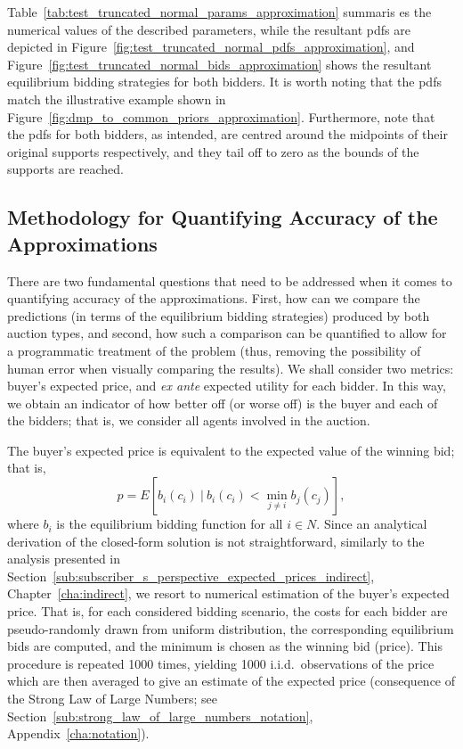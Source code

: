 Table~\ref{tab:test_truncated_normal_params_approximation} summaris es the numerical values of the described parameters, while the resultant pdfs are depicted in Figure~\ref{fig:test_truncated_normal_pdfs_approximation}, and Figure~\ref{fig:test_truncated_normal_bids_approximation} shows the resultant equilibrium bidding strategies for both bidders. It is worth noting that the pdfs match the illustrative example shown in Figure~\ref{fig:dmp_to_common_priors_approximation}. Furthermore, note that the pdfs for both bidders, as intended, are centred around the midpoints of their original supports respectively, and they tail off to zero as the bounds of the supports are reached.

\subsection{Methodology for Quantifying Accuracy of the Approximations} %
\label{sub:methodology_for_quantifying_accuracy_of_the_approximations_approximation}
There are two fundamental questions that need to be addressed when it comes to quantifying accuracy of the approximations. First, how can we compare the predictions (in terms of the equilibrium bidding strategies) produced by both auction types, and second, how such a comparison can be quantified to allow for a programmatic treatment of the problem (thus, removing the possibility of human error when visually comparing the results). We shall consider two metrics: buyer's expected price, and \emph{ex ante} expected utility for each bidder. In this way, we obtain an indicator of how better off (or worse off) is the buyer and each of the bidders; that is, we consider all agents involved in the auction.

The buyer's expected price is equivalent to the expected value of the winning bid; that is,
\begin{equation}
  \label{eq:expected_price_approximation}
  p = E[b_i(c_i) \:\vert\: b_i(c_i) < \min_{j\neq i} b_j(c_j)],
\end{equation}
where $b_i$ is the equilibrium bidding function for all $i\in N$. Since an analytical derivation of the closed-form solution is not straightforward, similarly to the analysis presented in Section~\ref{sub:subscriber_s_perspective_expected_prices_indirect}, Chapter~\ref{cha:indirect}, we resort to numerical estimation of the buyer's expected price. That is, for each considered bidding scenario, the costs for each bidder are pseudo-randomly drawn from uniform distribution, the corresponding equilibrium bids are computed, and the minimum is chosen as the winning bid (price). This procedure is repeated 1000 times, yielding 1000 i.i.d.~observations of the price which are then averaged to give an estimate of the expected price (consequence of the Strong Law of Large Numbers; see Section~\ref{sub:strong_law_of_large_numbers_notation}, Appendix~\ref{cha:notation}).

